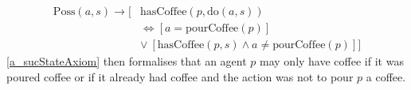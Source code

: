 \begin{equation}\label{a_sucStateAxiom}
  \begin{split}
    \mathrm{Poss}(a,s)\rightarrow \big[&\mathrm{hasCoffee}(p,\mathrm{do}(a,s))
\\    &\Leftrightarrow [a=\mathrm{pourCoffee}(p)]
\\    &\vee\ [\mathrm{hasCoffee}(p,s) \wedge a\neq \mathrm{pourCoffee}(p)]\big]
  \end{split}
\end{equation}
\autoref{a_sucStateAxiom} then formalises that an agent $p$ may only have coffee if it was poured coffee or if it already had coffee and the action was not to pour $p$ a coffee.
